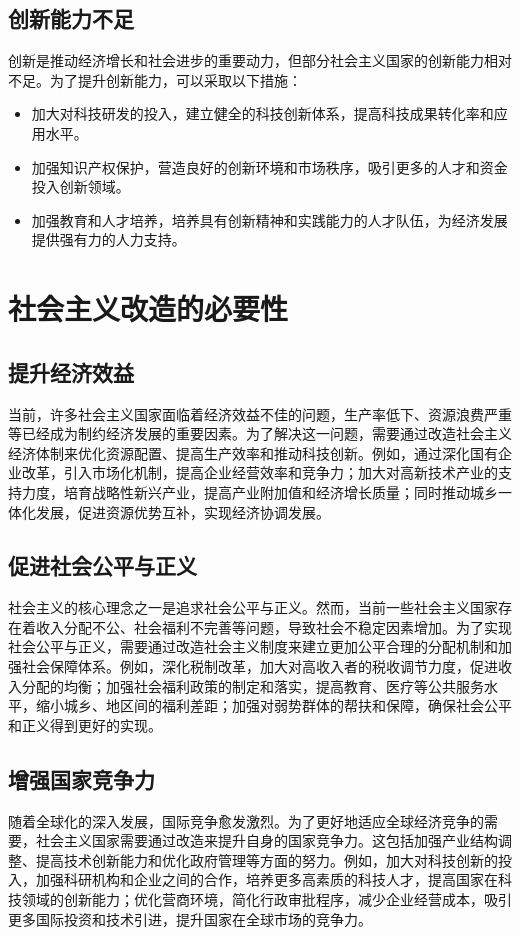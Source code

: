 \documentclass{article}
\begin{document}
\begin{CJK*}{UTF8}{gbsn}
  \subsection{创新能力不足}
  创新是推动经济增长和社会进步的重要动力，但部分社会主义国家的创新能力相对不足。为了提升创新能力，可以采取以下措施：
  \begin{itemize}
    \item 加大对科技研发的投入，建立健全的科技创新体系，提高科技成果转化率和应用水平。
    \item 加强知识产权保护，营造良好的创新环境和市场秩序，吸引更多的人才和资金投入创新领域。
    \item 加强教育和人才培养，培养具有创新精神和实践能力的人才队伍，为经济发展提供强有力的人力支持。
  \end{itemize}

  \section{社会主义改造的必要性}

  \subsection{提升经济效益}
  当前，许多社会主义国家面临着经济效益不佳的问题，生产率低下、资源浪费严重等已经成为制约经济发展的重要因素。为了解决这一问题，需要通过改造社会主义经济体制来优化资源配置、提高生产效率和推动科技创新。例如，通过深化国有企业改革，引入市场化机制，提高企业经营效率和竞争力；加大对高新技术产业的支持力度，培育战略性新兴产业，提高产业附加值和经济增长质量；同时推动城乡一体化发展，促进资源优势互补，实现经济协调发展。

  \subsection{促进社会公平与正义}
  社会主义的核心理念之一是追求社会公平与正义。然而，当前一些社会主义国家存在着收入分配不公、社会福利不完善等问题，导致社会不稳定因素增加。为了实现社会公平与正义，需要通过改造社会主义制度来建立更加公平合理的分配机制和加强社会保障体系。例如，深化税制改革，加大对高收入者的税收调节力度，促进收入分配的均衡；加强社会福利政策的制定和落实，提高教育、医疗等公共服务水平，缩小城乡、地区间的福利差距；加强对弱势群体的帮扶和保障，确保社会公平和正义得到更好的实现。

  \subsection{增强国家竞争力}
  随着全球化的深入发展，国际竞争愈发激烈。为了更好地适应全球经济竞争的需要，社会主义国家需要通过改造来提升自身的国家竞争力。这包括加强产业结构调整、提高技术创新能力和优化政府管理等方面的努力。例如，加大对科技创新的投入，加强科研机构和企业之间的合作，培养更多高素质的科技人才，提高国家在科技领域的创新能力；优化营商环境，简化行政审批程序，减少企业经营成本，吸引更多国际投资和技术引进，提升国家在全球市场的竞争力。


\end{CJK*}
\end{document}
